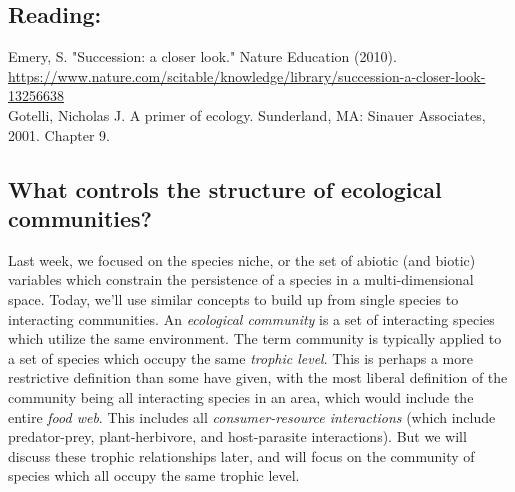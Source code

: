 \documentclass[12pt]{article}
\begin{document}
\subsection*{Reading:}

Emery, S. "Succession: a closer look." Nature Education (2010). \\ \url{https://www.nature.com/scitable/knowledge/library/succession-a-closer-look-13256638} \\

\bigskip
Gotelli, Nicholas J. A primer of ecology. Sunderland, MA: Sinauer Associates, 2001. Chapter 9.


















\begin{center}
\noindent\hrulefill 
\end{center}






\clearpage





\subsection*{What controls the structure of ecological communities?}

Last week, we focused on the species niche, or the set of abiotic (and biotic) variables which constrain the persistence of a species in a multi-dimensional space. Today, we'll use similar concepts to build up from single species to interacting communities. An \textit{ecological community} is a set of interacting species which utilize the same environment. The term community is typically applied to a set of species which occupy the same \textit{trophic level}. This is perhaps a more restrictive definition than some have given, with the most liberal definition of the community being all interacting species in an area, which would include the entire \textit{food web}. This includes all \textit{consumer-resource interactions} (which include predator-prey, plant-herbivore, and host-parasite interactions). But we will discuss these trophic relationships later, and will focus on the community of species which all occupy the same trophic level. 
\end{document}
